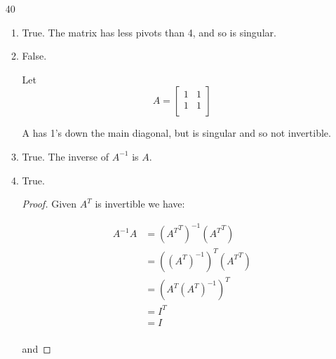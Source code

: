 \documentclass[12pt,letterpaper]{article}
\begin{document}
\begin{enumerate}
\begin{enumerate}
\begin{proof}
            \begin{align*}
              B(I - AB) &= (I - BA)B \\
              B &= (I - BA)B(I - AB)^{-1} \\
              I &= (I - BA)B(I - AB)^{-1}B^{-1} \\
              (I - BA)^{-1} &= B(I - AB)^{-1}B^{-1} \\
            \end{align*}

            Then $(I - BA)$ is invertible.
          \end{proof}
        \item [40]
          \begin{enumerate}[label=(\alph*)]
            \item True. The matrix has less pivots than 4, and so is singular.
            \item

              False.

              Let
              \[
                A
                =
                \begin{bmatrix}
                  1 & 1 \\
                  1 & 1 \\
                \end{bmatrix}
              \]

              A has 1's down the main diagonal,
              but is singular and so not invertible.
            \item True. The inverse of $A^{-1}$ is $A$.
            \item True.
              \begin{proof}
                Given $A^T$ is invertible we have:

                \begin{align*}
                  A^{-1}A &= \left({A^T}^T\right)^{-1}\left({A^T}^T\right) \\
                  &= \left(\left({A^T}\right)^{-1}\right)^T\left({A^T}^T\right) \\
                  &= \left({A^T}\left({A^T}\right)^{-1}\right)^T \\
                  &= I^T \\
                  &= I \\
                \end{align*}

                and


\end{proof}
\end{enumerate}
\end{enumerate}
\end{enumerate}
\end{document}
